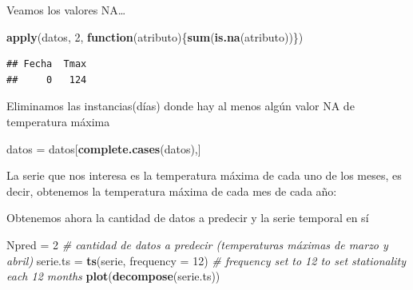 \documentclass[]{article}
\newenvironment{Shaded}{\begin{snugshade}}{\end{snugshade}}
\newcommand{\KeywordTok}[1]{\textcolor[rgb]{0.13,0.29,0.53}{\textbf{#1}}}
\newcommand{\DataTypeTok}[1]{\textcolor[rgb]{0.13,0.29,0.53}{#1}}
\newcommand{\DecValTok}[1]{\textcolor[rgb]{0.00,0.00,0.81}{#1}}
\newcommand{\StringTok}[1]{\textcolor[rgb]{0.31,0.60,0.02}{#1}}
\newcommand{\CommentTok}[1]{\textcolor[rgb]{0.56,0.35,0.01}{\textit{#1}}}
\newcommand{\ControlFlowTok}[1]{\textcolor[rgb]{0.13,0.29,0.53}{\textbf{#1}}}
\newcommand{\OperatorTok}[1]{\textcolor[rgb]{0.81,0.36,0.00}{\textbf{#1}}}
\newcommand{\NormalTok}[1]{#1}
\begin{document}
Veamos los valores NA\ldots{}

\begin{Shaded}
\begin{Highlighting}[]
\KeywordTok{apply}\NormalTok{(datos, }\DecValTok{2}\NormalTok{, }\ControlFlowTok{function}\NormalTok{(atributo)\{}\KeywordTok{sum}\NormalTok{(}\KeywordTok{is.na}\NormalTok{(atributo))\})}
\end{Highlighting}
\end{Shaded}

\begin{verbatim}
## Fecha  Tmax 
##     0   124
\end{verbatim}

Eliminamos las instancias(días) donde hay al menos algún valor NA de
temperatura máxima

\begin{Shaded}
\begin{Highlighting}[]
\NormalTok{datos =}\StringTok{ }\NormalTok{datos[}\KeywordTok{complete.cases}\NormalTok{(datos),]}
\end{Highlighting}
\end{Shaded}

La serie que nos interesa es la temperatura máxima de cada uno de los
meses, es decir, obtenemos la temperatura máxima de cada mes de cada
año:

\begin{Shaded}
\end{Shaded}

Obtenemos ahora la cantidad de datos a predecir y la serie temporal en
sí

\begin{Shaded}
\begin{Highlighting}[]
\NormalTok{Npred =}\StringTok{ }\DecValTok{2} \CommentTok{# cantidad de datos a predecir (temperaturas máximas de marzo y abril)}
\NormalTok{serie.ts =}\StringTok{ }\KeywordTok{ts}\NormalTok{(serie, }\DataTypeTok{frequency =} \DecValTok{12}\NormalTok{) }\CommentTok{# frequency set to 12 to set stationality each 12 months}
\KeywordTok{plot}\NormalTok{(}\KeywordTok{decompose}\NormalTok{(serie.ts))}
\end{Highlighting}
\end{Shaded}
\end{document}

